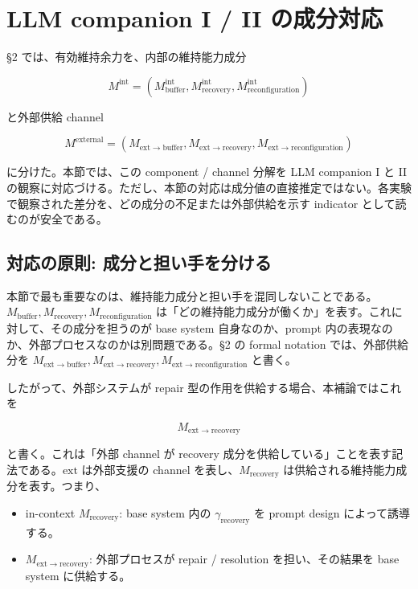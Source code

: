 \documentclass[12pt,a4paper]{article}
\begin{document}
\section{LLM companion I / II の成分対応}\label{llm-companion-i-ii-ux306eux6210ux5206ux5bfeux5fdc}

§2 では、有効維持余力を、内部の維持能力成分

\[
M^{\mathrm{int}}=(M_{\mathrm{buffer}}^{\mathrm{int}},M_{\mathrm{recovery}}^{\mathrm{int}},M_{\mathrm{reconfiguration}}^{\mathrm{int}})
\]

と外部供給 channel

\[
M^{\mathrm{external}}=(M_{\mathrm{ext}\to\mathrm{buffer}},M_{\mathrm{ext}\to\mathrm{recovery}},M_{\mathrm{ext}\to\mathrm{reconfiguration}})
\]

に分けた。本節では、この component / channel 分解を LLM companion I と II の観察に対応づける。ただし、本節の対応は成分値の直接推定ではない。各実験で観察された差分を、どの成分の不足または外部供給を示す indicator として読むのが安全である。

\subsection{対応の原則: 成分と担い手を分ける}\label{ux5bfeux5fdcux306eux539fux5247-ux6210ux5206ux3068ux62c5ux3044ux624bux3092ux5206ux3051ux308b}

本節で最も重要なのは、維持能力成分と担い手を混同しないことである。\(M_{\mathrm{buffer}}, M_{\mathrm{recovery}}, M_{\mathrm{reconfiguration}}\) は「どの維持能力成分が働くか」を表す。これに対して、その成分を担うのが base system 自身なのか、prompt 内の表現なのか、外部プロセスなのかは別問題である。§2 の formal notation では、外部供給分を \(M_{\mathrm{ext}\to\mathrm{buffer}}, M_{\mathrm{ext}\to\mathrm{recovery}}, M_{\mathrm{ext}\to\mathrm{reconfiguration}}\) と書く。

したがって、外部システムが repair 型の作用を供給する場合、本補論ではこれを

\[
M_{\mathrm{ext}\to\mathrm{recovery}}
\]

と書く。これは「外部 channel が recovery 成分を供給している」ことを表す記法である。\(\mathrm{ext}\) は外部支援の channel を表し、\(M_{\mathrm{recovery}}\) は供給される維持能力成分を表す。つまり、

\begin{itemize}
\tightlist
\item
  in-context \(M_{\mathrm{recovery}}\): base system 内の \(\gamma_{\mathrm{recovery}}\) を prompt design によって誘導する。
\item
  \(M_{\mathrm{ext}\to\mathrm{recovery}}\): 外部プロセスが repair / resolution を担い、その結果を base system に供給する。
\end{itemize}
\end{document}
